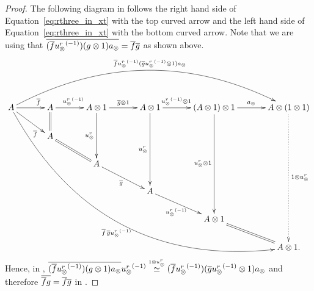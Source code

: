 \begin{proof}
      The following diagram in \X follows the right hand side of Equation~\ref{eq:rthree_in_xt}
      with the top curved arrow and the left hand side of Equation~\ref{eq:rthree_in_xt} with the
      bottom curved arrow. Note that we are using that
      $\overline{(\overline{f} {u_{\otimes}^r}^{(-1)}) (g\otimes 1) a_{\otimes}} = \overline{f}\overline{g}$ as shown above.
      \[
        \xymatrix @C=33pt @R=20pt{
          A \ar@/^45pt/[rrrrr]^{\restr{f} \inv{\usr}(\restr{g} \inv{\usr} \* 1)a_{\*}}
            \ar@/_65pt/[dddddrrrrr]_{\restr{f}\, \restr{g}\inv{\usr}}
            \ar[r]^(.7){\restr{f}}
            \ar[dr]_(.7){\restr{f}}
            &A \ar[r]^{\inv{\usr}}
            \ar@{=}[d]
            &A \* 1 \ar[r]^{\restr{g}\*1}
            \ar[dd]_{\usr}
            &A \* 1 \ar[r]^(.41){\inv{\usr}\* 1}
            \ar[ddd]_{\usr}
            &(A \* 1) \* 1 \ar[r]^{a_{\*}}
            \ar[dddd]_{\usr\*1}
            & A \* (1\*1) \ar@{.>}[ddddd]^{1\*\usr}\\
          &A\ar@{=}[dr]\\
          &&A \ar[dr]_{\restr{g}}\\
          &&&A \ar[dr]_{\inv\usr}\\
          &&&&A\*1 \ar@{=}[dr]\\
          &&&&&A\*1.
        }
      \]
      Hence, in \X, $\overline{(\overline{f} {u_{\otimes}^r}^{(-1)}) (g\otimes 1) a_{\otimes}} {u_{\otimes}^r}^{(-1)} \overset{\scriptscriptstyle 1\otimes u_{\otimes}^r}{\simeq}
      (\overline{f} {u_{\otimes}^r}^{(-1)}) (\overline{g} {u_{\otimes}^r}^{(-1)}\otimes 1) a_{\otimes}$ and therefore $\overline{\overline{f} g} =
      \overline{f} \overline{g}$ in \Xt.


\end{proof}
